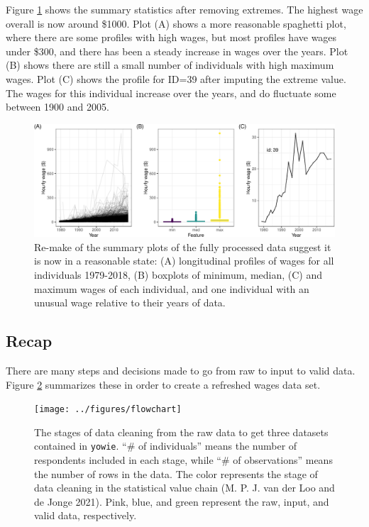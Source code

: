 \documentclass[12pt]{article}
\begin{document}
Figure \ref{fig:fixed-feature-plot} shows the summary statistics after removing extremes. The highest wage overall is now around \$1000. Plot (A) shows a more reasonable spaghetti plot, where there are some profiles with high wages, but most profiles have wages under \$300, and there has been a steady increase in wages over the years. Plot (B) shows there are still a small number of individuals with high maximum wages. Plot (C) shows the profile for ID=39 after imputing the extreme value. The wages for this individual increase over the years, and do fluctuate some between 1900 and 2005.

\begin{figure}

{\centering \includegraphics[width=1\linewidth]{figures/fixed-feature-plot-1} 

}

\caption{Re-make of the summary plots of the fully processed data suggest it is now in a reasonable state: (A) longitudinal profiles of wages for all individuals 1979-2018, (B) boxplots of minimum, median, (C) and maximum wages of each individual, and one individual with an unusual wage relative to their years of data. }\label{fig:fixed-feature-plot}
\end{figure}

\hypertarget{recap}{%
\subsection{Recap}\label{recap}}

There are many steps and decisions made to go from raw to input to valid data. Figure \ref{fig:flow-chart} summarizes these in order to create a refreshed wages data set.



\begin{figure}

{\centering \texttt{[image: ../figures/flowchart]} 

}

\caption{The stages of data cleaning from the raw data to get three datasets contained in \texttt{yowie}. ``\# of individuals'' means the number of respondents included in each stage, while ``\# of observations'' means the number of rows in the data. The color represents the stage of data cleaning in the statistical value chain (M. P. J. van der Loo and de Jonge 2021). Pink, blue, and green represent the raw, input, and valid data, respectively.}\label{fig:flow-chart}
\end{figure}
\end{document}
